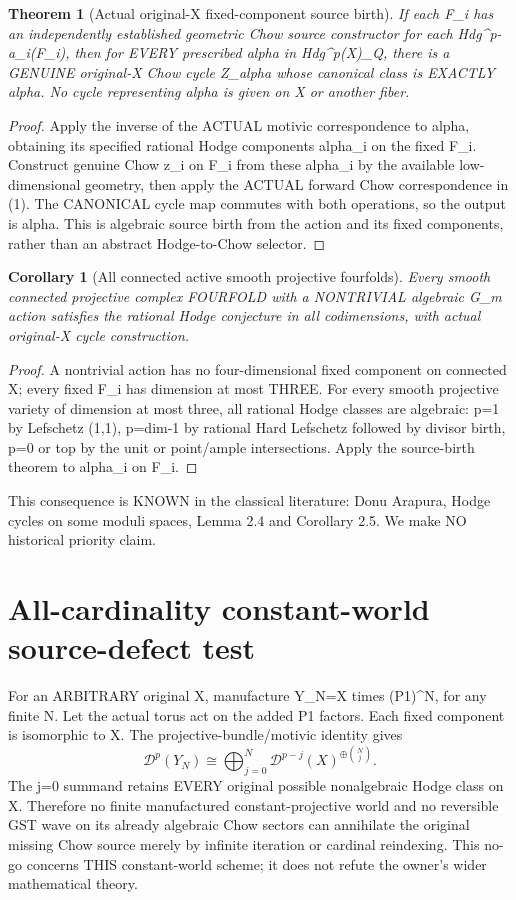 \documentclass[11pt]{article}
\newtheorem{theorem}{Theorem}
\newtheorem{corollary}{Corollary}
\begin{document}
\begin{theorem}[Actual original-X fixed-component source birth]
If each F_i has an independently established geometric
Chow source constructor for each Hdg^{p-a_i}(F_i),
then for EVERY prescribed alpha in Hdg^p(X)_Q,
there is a GENUINE original-X Chow cycle Z_alpha
whose canonical class is EXACTLY alpha.
No cycle representing alpha is given on X or another fiber.
\end{theorem}
\begin{proof}
Apply the inverse of the ACTUAL motivic correspondence
to alpha, obtaining its specified rational Hodge
components alpha_i on the fixed F_i.
Construct genuine Chow z_i on F_i from these alpha_i
by the available low-dimensional geometry, then apply
the ACTUAL forward Chow correspondence in (1).
The CANONICAL cycle map commutes with both operations,
so the output is alpha. This is algebraic source birth
from the action and its fixed components, rather than
an abstract Hodge-to-Chow selector.
\end{proof}

\begin{corollary}[All connected active smooth projective fourfolds]
Every smooth connected projective complex FOURFOLD
with a NONTRIVIAL algebraic G_m action satisfies
the rational Hodge conjecture in all codimensions,
with actual original-X cycle construction.
\end{corollary}
\begin{proof}
A nontrivial action has no four-dimensional fixed
component on connected X; every fixed F_i has dimension
at most THREE. For every smooth projective variety
of dimension at most three, all rational Hodge classes
are algebraic: p=1 by Lefschetz (1,1), p=dim-1 by
rational Hard Lefschetz followed by divisor birth,
p=0 or top by the unit or point/ample intersections.
Apply the source-birth theorem to alpha_i on F_i.
\end{proof}
This consequence is KNOWN in the classical literature:
Donu Arapura, Hodge cycles on some moduli spaces,
Lemma 2.4 and Corollary 2.5. We make NO
historical priority claim.

\section{All-cardinality constant-world source-defect test}
For an ARBITRARY original X, manufacture
Y_N=X times (P1)^N, for any finite N.
Let the actual torus act on the added P1 factors.
Each fixed component is isomorphic to X.
The projective-bundle/motivic identity gives
\[
\boxed{\mathcal D^p(Y_N)\cong
\bigoplus_{j=0}^N
\mathcal D^{p-j}(X)^{\oplus {N\choose j}}.}
\tag{4}
\]
The j=0 summand retains EVERY original possible
nonalgebraic Hodge class on X. Therefore no finite
manufactured constant-projective world and no
reversible GST wave on its already algebraic
Chow sectors can annihilate the original missing
Chow source merely by infinite iteration or
cardinal reindexing. This no-go concerns THIS
constant-world scheme; it does not refute the
owner's wider mathematical theory.
\end{document}
